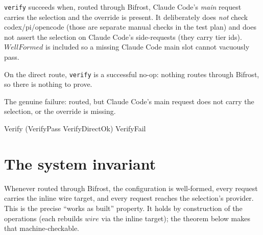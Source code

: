 \documentclass{article}
\begin{document}
\texttt{verify} succeeds when, routed through Bifrost, Claude Code's \emph{main}
request carries the selection and the override is present. It deliberately does
\emph{not} check codex/pi/opencode (those are separate manual checks in the
test plan) and does not assert the selection on Claude Code's side-requests
(they carry tier ids). $WellFormed$ is included so a missing Claude Code main
slot cannot vacuously pass.


On the direct route, \texttt{verify} is a successful no-op: nothing routes
through Bifrost, so there is nothing to prove.


The genuine failure: routed, but Claude Code's main request does not carry the
selection, or the override is missing.


\begin{zed}
  Verify  (VerifyPass \lor VerifyDirectOk) \lor VerifyFail
\end{zed}

\section{The system invariant}

Whenever routed through Bifrost, the configuration is well-formed, every
request carries the inline wire target, and every request reaches the
selection's provider. This is the precise ``works as built'' property. It holds
by construction of the operations (each rebuilds $wire$ via the inline target); the
theorem below makes that machine-checkable.
\end{document}
